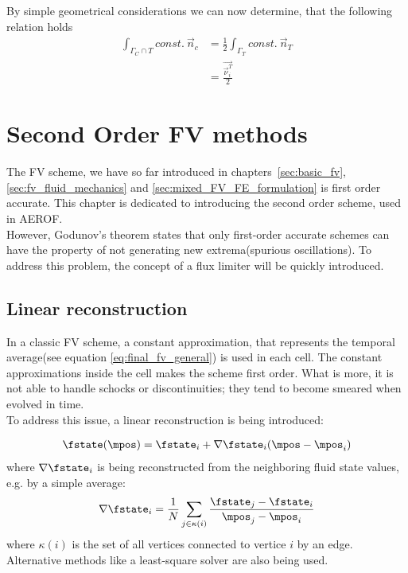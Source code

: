 \documentclass[../main.tex]{subfiles}
\begin{document}
By simple geometrical considerations we can now determine, that the following relation holds
\begin{align}\label{eq:final_relation}
\int_{\Gamma_C \cap T} const.~\vec{n}_c &= \frac{1}{2}\int_{\Gamma_T} const.~\vec{n}_T \\
                                        &= \frac{\vec{\vec{\nu}_i^T}}{2}
\end{align}



\section{Second Order \ac{FV} methods}\label{sec:fv_ordertwo}

The \ac{FV} scheme, we have so far introduced in chapters~\ref{sec:basic_fv},\ref{sec:fv_fluid_mechanics} and \ref{sec:mixed_FV_FE_formulation} is first order accurate. This chapter is dedicated to introducing the second order scheme, used in AEROF.\\
However, Godunov's theorem \cite{Godunov1959} states that only first-order accurate schemes can have the property of not generating new extrema(spurious oscillations)\cite{Godunov1959}. To address this problem, the concept of a flux limiter will be quickly introduced.



\subsection{Linear reconstruction}\label{sec:linear_reconstruction}
In a classic FV scheme, a constant approximation, that represents the temporal average(see equation \eqref{eq:final_fv_general}) is used in each cell. The constant approximations inside the cell makes the scheme first order. What is more, it is not able to handle schocks or discontinuities; they tend to become smeared when evolved in time.\\
To address this issue, a linear reconstruction is being introduced:

\begin{align}\label{eq:linear_reconstruction}
\fstate(\mpos)=\fstate_i+\nabla\fstate_i (\mpos-\mpos_i)
\end{align}
where $\nabla\fstate_i$ is being reconstructed from the neighboring fluid state values, e.g. by a simple average:
\begin{align}\label{eq:gradient_average}
\nabla\fstate_i=\frac{1}{N} \sum_{j\in\kappa(i)} \frac{\fstate_j-\fstate_i}{\mpos_j-\mpos_i}
\end{align}
where $\kappa(i)$ is the set of all vertices connected to vertice $i$ by an edge. Alternative methods like a least-square solver are also being used.\\
\end{document}
